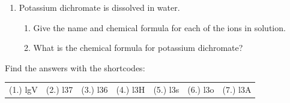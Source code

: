 \begin{enumerate}[noitemsep, label=\textbf{\arabic*}. ]
    \addtocounter{footnote}{-0}
            \label{m38689*uid185}\item Potassium dichromate is dissolved in water.
\label{m38689*id148361}\begin{enumerate}[noitemsep, label=\textbf{\alph*}. ] 
            \label{m38689*uid186}\item Give the name and chemical formula for each of the ions in solution.
\label{m38689*uid187}\item What is the chemical formula for potassium dichromate?
\end{enumerate}
                \end{enumerate}
        
      

    
  \label{m38689**end}
          
       
    
  \label{6cd7661dc7a31822d94f8eef4ac8e3a5**end}
    
\par {} Find the answers with the shortcodes:
 \par \begin{tabular}[h]{cccccc}
 (1.) lgV  &  (2.) l37  &  (3.) l36  &  (4.) l3H  &  (5.) l3s  &  (6.) l3o  &  (7.) l3A  & \end{tabular}



